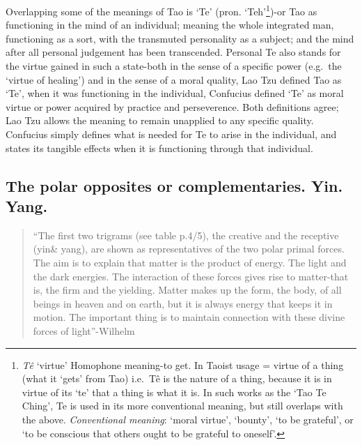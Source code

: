 \documentclass[11pt]{book}
\begin{document}
Overlapping some of the meanings of Tao is `Te' (pron. `Teh'\footnote{\emph{Tê} `virtue' Homophone meaning-to get. In Taoist usage = virtue of a thing (what it `gets' from Tao) i.e.~Tê is the nature of a thing, because it is in virtue of its `te' that a thing is what it is. In such works as the `Tao Te Ching', Te is used in its more conventional meaning, but still overlaps with the above. \emph{Conventional meaning}: `moral virtue', `bounty', `to be grateful', or `to be conscious that others ought to be grateful to oneself'.})-or Tao as functioning in the mind of an individual; meaning the whole integrated man, functioning as a sort, with the transmuted personality as a subject; and the mind after all personal judgement has been transcended. Personal Te also stands for the virtue gained in such a state-both in the sense of a specific power (e.g.~the `virtue of healing') and in the sense of a moral quality, Lao Tzu defined Tao as `Te', when it was functioning in the individual, Confucius defined `Te' as moral virtue or power acquired by practice and perseverence. Both definitions agree; Lao Tzu allows the meaning to remain unapplied to any specific quality. Confucius simply defines what is needed for Te to arise in the individual, and states its tangible effects when it is functioning through that individual.

\hypertarget{the-polar-opposites-or-complementaries.-yin.-yang.}{%
\subsection{The polar opposites or complementaries. Yin. Yang.}\label{the-polar-opposites-or-complementaries.-yin.-yang.}}

\begin{quote}
``The first two trigrams (see table p.4/5), the creative and the receptive (yin\& yang), are shown as representatives of the two polar primal forces. The aim is to explain that matter is the product of energy. The light and the dark energies. The interaction of these forces gives rise to matter-that is, the firm and the yielding. Matter makes up the form, the body, of all beings in heaven and on earth, but it is always energy that keeps it in motion. The important thing is to maintain connection with these divine forces of light''-Wilhelm
\end{quote}
\end{document}

